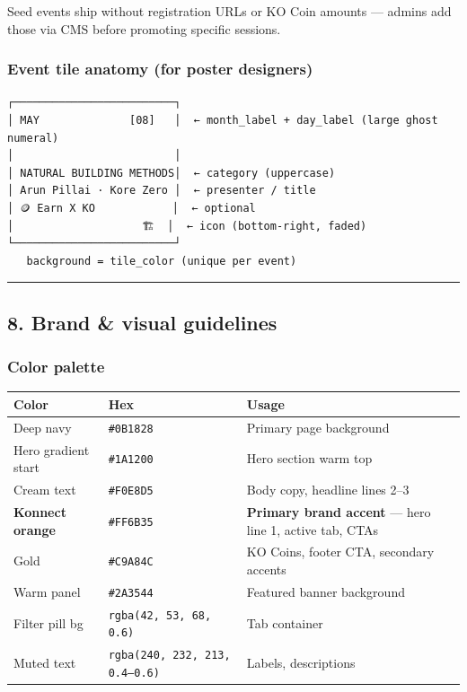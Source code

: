 \documentclass[11pt,a4paper]{report}
\begin{document}
Seed events ship without registration URLs or KO Coin amounts --- admins add those via CMS before promoting specific sessions.


\subsubsection{Event tile anatomy (for poster designers)}

\begin{verbatim}
┌─────────────────────────┐
│ MAY              [08]   │  ← month_label + day_label (large ghost numeral)
│                         │
│ NATURAL BUILDING METHODS│  ← category (uppercase)
│ Arun Pillai · Kore Zero │  ← presenter / title
│ 🪙 Earn X KO            │  ← optional
│                    🏗️  │  ← icon (bottom-right, faded)
└─────────────────────────┘
   background = tile_color (unique per event)
\end{verbatim}

\medskip\hrule\medskip

\subsection{8. Brand \& visual guidelines}

\subsubsection{Color palette}

\begin{longtable}{|l|l|l|}
\hline
Color & Hex & Usage \\ \hline
Deep navy & \texttt{\#0B1828} & Primary page background \\ \hline
Hero gradient start & \texttt{\#1A1200} & Hero section warm top \\ \hline
Cream text & \texttt{\#F0E8D5} & Body copy, headline lines 2--3 \\ \hline
\textbf{Konnect orange} & \texttt{\#FF6B35} & \textbf{Primary brand accent} --- hero line 1, active tab, CTAs \\ \hline
Gold & \texttt{\#C9A84C} & KO Coins, footer CTA, secondary accents \\ \hline
Warm panel & \texttt{\#2A3544} & Featured banner background \\ \hline
Filter pill bg & \texttt{rgba(42, 53, 68, 0.6)} & Tab container \\ \hline
Muted text & \texttt{rgba(240, 232, 213, 0.4--0.6)} & Labels, descriptions \\
\hline
\end{longtable}
\end{document}

